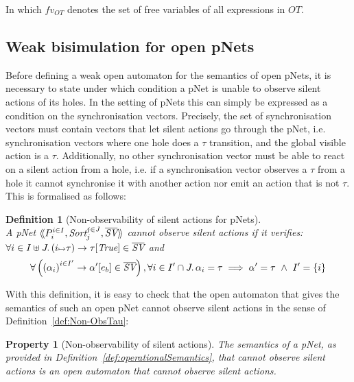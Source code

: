\documentclass{lmcs}
\newtheorem{definition}{Definition}
\newtheorem{property}{Property}
\begin{document}
In which $fv_{OT}$ denotes the set of free variables of all expressions in $OT$.
\subsection{Weak bisimulation for open pNets}

Before defining a weak open automaton for the semantics of open pNets,
it is necessary to state under which condition a pNet is unable to
observe silent actions of its holes. In the setting of pNets this can
simply be expressed as a condition on the synchronisation
vectors. Precisely, the set of synchronisation vectors must contain
vectors that let silent actions go through the pNet,
i.e. synchronisation vectors where one hole does a $\tau$ transition,
and the global visible action is a $\tau$. Additionally, no other
synchronisation vector must be able to react on a silent action from a
hole, i.e. if a synchronisation vector observes a $\tau$ from a hole
it cannot synchronise it with another action nor emit an action that
is not $\tau$. This is formalised as follows:



\begin{definition}[Non-observability of silent actions for pNets]\label{def:non-obspNet}~\\
A pNet $\mylangle \pNet_i^{i\in I} , \Sort_j^{j\in J}, \set{\symb{SV}}\myrangle$
 \emph{cannot observe silent actions} if it verifies:\\ $\forall i\in I\uplus J.\, \SV{(i\mapsto \tau)}{\tau}{\True}\in \set{\symb{SV}}$ and 
\begin{equation*}
\forall \left(\SV{{(\alpha_i)}^{i\in I'}} 
{\alpha'} 
{e_b}\in \set{\symb{SV}}\right), %
\forall i\in I'\cap J.\, \alpha_i=\tau \implies %
\alpha'=\tau ~\land~ %
I'=\{i\}
\end{equation*}
\end{definition}

With this definition, it is easy to check that the open automaton that gives the semantics of such an open pNet cannot observe silent actions in the sense of Definition~\ref{def:Non-ObsTau}:

\begin{property}[Non-observability of silent actions]
The  semantics of a pNet, as provided in Definition~\ref{def:operationalSemantics}, that cannot observe silent actions is an open automaton that  cannot observe silent actions.
\end{property}
\end{document}
